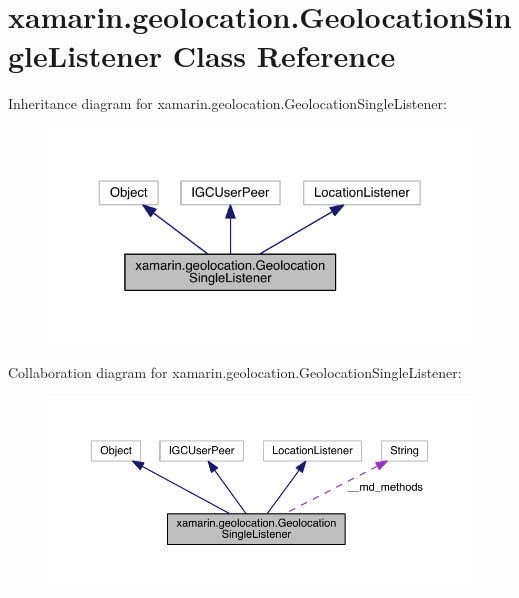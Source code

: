 \hypertarget{classxamarin_1_1geolocation_1_1_geolocation_single_listener}{\section{xamarin.\+geolocation.\+Geolocation\+Single\+Listener Class Reference}
\label{classxamarin_1_1geolocation_1_1_geolocation_single_listener}
}


Inheritance diagram for xamarin.\+geolocation.\+Geolocation\+Single\+Listener\+:
\nopagebreak
\begin{figure}[H]
\begin{center}
\leavevmode
\includegraphics[width=325pt]{classxamarin_1_1geolocation_1_1_geolocation_single_listener__inherit__graph}
\end{center}
\end{figure}


Collaboration diagram for xamarin.\+geolocation.\+Geolocation\+Single\+Listener\+:
\nopagebreak
\begin{figure}[H]
\begin{center}
\leavevmode
\includegraphics[width=350pt]{classxamarin_1_1geolocation_1_1_geolocation_single_listener__coll__graph}
\end{center}
\end{figure}
